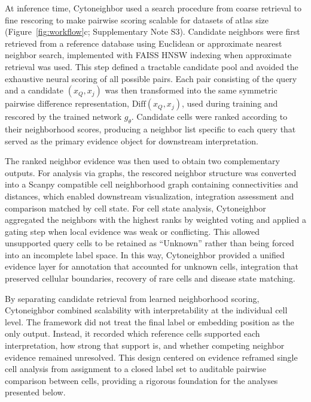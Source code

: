 \documentclass[11pt]{article}
\begin{document}
At inference time, Cytoneighbor used a search procedure from coarse retrieval to fine rescoring to make pairwise scoring scalable for datasets of atlas size (Figure~\ref{fig:workflow}c; Supplementary Note S3). Candidate neighbors were first retrieved from a reference database using Euclidean or approximate nearest neighbor search, implemented with FAISS HNSW indexing when approximate retrieval was used\cite{Johnson2019FAISS,Malkov2018HNSW}. This step defined a tractable candidate pool and avoided the exhaustive neural scoring of all possible pairs. Each pair consisting of the query and a candidate $(x_Q,x_j)$ was then transformed into the same symmetric pairwise difference representation, $\mathrm{Diff}(x_Q,x_j)$, used during training and rescored by the trained network $g_{\theta}$. Candidate cells were ranked according to their neighborhood scores, producing a neighbor list specific to each query that served as the primary evidence object for downstream interpretation.

The ranked neighbor evidence was then used to obtain two complementary outputs. For analysis via graphs, the rescored neighbor structure was converted into a Scanpy\cite{Wolf2018Scanpy} compatible cell neighborhood graph containing connectivities and distances, which enabled downstream visualization, integration assessment and comparison matched by cell state. For cell state analysis, Cytoneighbor aggregated the neighbors with the highest ranks by weighted voting and applied a gating step when local evidence was weak or conflicting\cite{Wolf2018Scanpy}. This allowed unsupported query cells to be retained as ``Unknown''\cite{Pasquini2021AnnotationReview} rather than being forced into an incomplete label space. In this way, Cytoneighbor provided a unified evidence layer for annotation that accounted for unknown cells, integration that preserved cellular boundaries, recovery of rare cells and disease state matching.

By separating candidate retrieval from learned neighborhood scoring, Cytoneighbor combined scalability with interpretability at the individual cell level. The framework did not treat the final label or embedding position as the only output. Instead, it recorded which reference cells supported each interpretation, how strong that support is, and whether competing neighbor evidence remained unresolved. This design centered on evidence reframed single cell analysis from assignment to a closed label set to auditable pairwise comparison between cells, providing a rigorous foundation for the analyses presented below.
\end{document}
